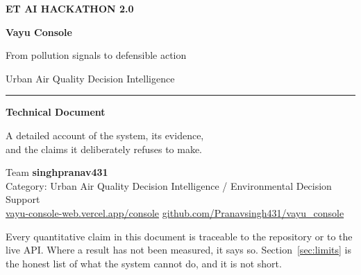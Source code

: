 \documentclass[11pt,a4paper]{article}
\begin{document}
\begin{titlepage}
\pagecolor{vblack}\color{white}
\thispagestyle{empty}
\vspace*{3.2cm}

{\footnotesize\bfseries\color{vamber!85!white}\hspace{1pt} ET AI HACKATHON 2.0\par}
\vspace{0.9cm}
{\fontsize{46}{50}\selectfont\bfseries Vayu Console\par}
\vspace{0.5cm}
{\LARGE\color{vline} From pollution signals to defensible action\par}
\vspace{0.4cm}
{\large\color{vgrey!60!white} Urban Air Quality Decision Intelligence\par}

\vspace{1.4cm}
{\color{vamber!85!white}\rule{5cm}{1.2pt}}
\vspace{1.2cm}

{\Large\bfseries Technical Document\par}
\vspace{0.35cm}
{\normalsize\color{vline} A detailed account of the system, its evidence,\\
and the claims it deliberately refuses to make.\par}

\vfill
{\footnotesize\color{vgrey!70!white}
Team \textbf{\color{white}singhpranav431}\\[0.3em]
Category: Urban Air Quality Decision Intelligence / Environmental Decision Support\\[0.3em]
\href{https://vayu-console-web.vercel.app/console}{\color{vamber!85!white}vayu-console-web.vercel.app/console}
\quad\textbullet\quad
\href{https://github.com/Pranavsingh431/vayu_console}{\color{vamber!85!white}github.com/Pranavsingh431/vayu\_console}
\par}
\end{titlepage}
\nopagecolor\color{black}

\tableofcontents
\thispagestyle{fancy}
\vspace{1em}

\noindent\small\color{vgrey}
Every quantitative claim in this document is traceable to the repository or to the
live API. Where a result has not been measured, it says so. Section~\ref{sec:limits}
is the honest list of what the system cannot do, and it is not short.
\color{black}\normalsize
\end{document}
